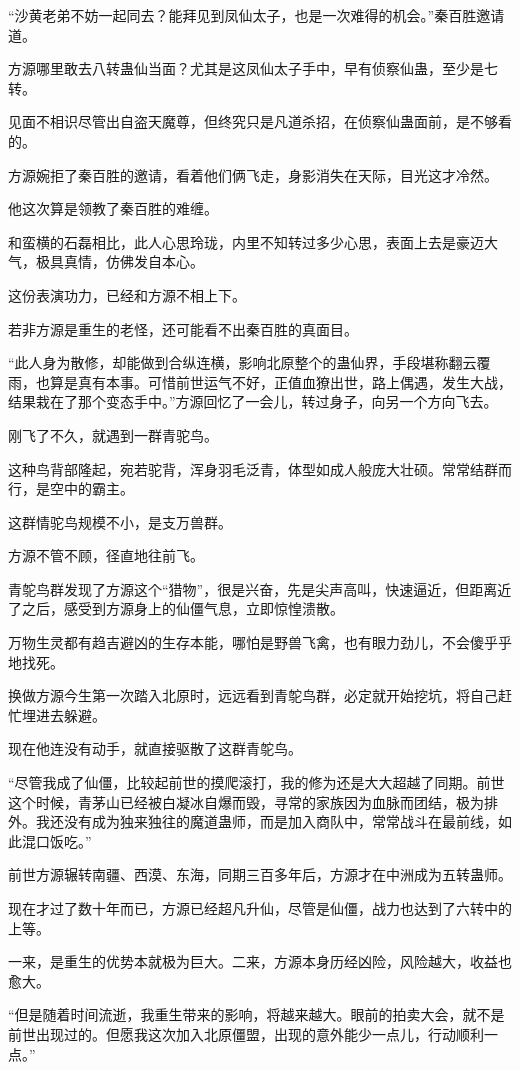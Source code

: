 \begin{this_body}
“沙黄老弟不妨一起同去？能拜见到凤仙太子，也是一次难得的机会。”秦百胜邀请道。

方源哪里敢去八转蛊仙当面？尤其是这凤仙太子手中，早有侦察仙蛊，至少是七转。

见面不相识尽管出自盗天魔尊，但终究只是凡道杀招，在侦察仙蛊面前，是不够看的。

方源婉拒了秦百胜的邀请，看着他们俩飞走，身影消失在天际，目光这才冷然。

他这次算是领教了秦百胜的难缠。

和蛮横的石磊相比，此人心思玲珑，内里不知转过多少心思，表面上去是豪迈大气，极具真情，仿佛发自本心。

这份表演功力，已经和方源不相上下。

若非方源是重生的老怪，还可能看不出秦百胜的真面目。

“此人身为散修，却能做到合纵连横，影响北原整个的蛊仙界，手段堪称翻云覆雨，也算是真有本事。可惜前世运气不好，正值血獠出世，路上偶遇，发生大战，结果栽在了那个变态手中。”方源回忆了一会儿，转过身子，向另一个方向飞去。

刚飞了不久，就遇到一群青驼鸟。

这种鸟背部隆起，宛若驼背，浑身羽毛泛青，体型如成人般庞大壮硕。常常结群而行，是空中的霸主。

这群情驼鸟规模不小，是支万兽群。

方源不管不顾，径直地往前飞。

青鸵鸟群发现了方源这个“猎物”，很是兴奋，先是尖声高叫，快速逼近，但距离近了之后，感受到方源身上的仙僵气息，立即惊惶溃散。

万物生灵都有趋吉避凶的生存本能，哪怕是野兽飞禽，也有眼力劲儿，不会傻乎乎地找死。

换做方源今生第一次踏入北原时，远远看到青鸵鸟群，必定就开始挖坑，将自己赶忙埋进去躲避。

现在他连没有动手，就直接驱散了这群青鸵鸟。

“尽管我成了仙僵，比较起前世的摸爬滚打，我的修为还是大大超越了同期。前世这个时候，青茅山已经被白凝冰自爆而毁，寻常的家族因为血脉而团结，极为排外。我还没有成为独来独往的魔道蛊师，而是加入商队中，常常战斗在最前线，如此混口饭吃。”

前世方源辗转南疆、西漠、东海，同期三百多年后，方源才在中洲成为五转蛊师。

现在才过了数十年而已，方源已经超凡升仙，尽管是仙僵，战力也达到了六转中的上等。

一来，是重生的优势本就极为巨大。二来，方源本身历经凶险，风险越大，收益也愈大。

“但是随着时间流逝，我重生带来的影响，将越来越大。眼前的拍卖大会，就不是前世出现过的。但愿我这次加入北原僵盟，出现的意外能少一点儿，行动顺利一点。”


\end{this_body}
